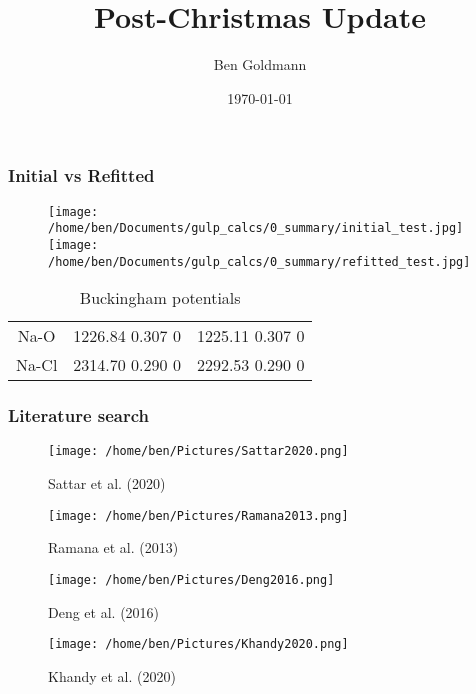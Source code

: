 \documentclass{beamer}
\title{Post-Christmas Update}
\author{Ben Goldmann}
\date{\today}
\begin{document}
\begin{frame}
\titlepage
\end{frame}

\begin{frame}
\frametitle{Initial vs Refitted}

\begin{figure}
\texttt{[image: /home/ben/Documents/gulp\_calcs/0\_summary/initial\_test.jpg]}%
\texttt{[image: /home/ben/Documents/gulp\_calcs/0\_summary/refitted\_test.jpg]}
\end{figure}

\begin{table}[h!]
  \begin{center}
    \caption{Buckingham potentials}
    \begin{tabular}{c|c|c}
      \hline
      Na-O & 1226.84 0.307 0 & 1225.11 0.307 0 \\
      Na-Cl & 2314.70 0.290 0 & 2292.53 0.290 0 \\
    \end{tabular}
  \end{center}
\end{table}

\end{frame}

\begin{frame}[shrink=10]
\frametitle{Literature search}

\begin{figure}[ht]
  \begin{minipage}{0.45\linewidth}
    \centering
      \texttt{[image: /home/ben/Pictures/Sattar2020.png]}
      \caption{Sattar et al. (2020)}
      \texttt{[image: /home/ben/Pictures/Ramana2013.png]}
      \caption{Ramana et al. (2013)}
  \end{minipage}
  \hspace{0.5cm}
  \begin{minipage}{0.45\linewidth}
    \centering
      \texttt{[image: /home/ben/Pictures/Deng2016.png]}
      \caption{Deng et al. (2016)}
      \texttt{[image: /home/ben/Pictures/Khandy2020.png]}
      \caption{Khandy et al. (2020)}
  \end{minipage}
\end{figure}

\end{frame}
\end{document}
